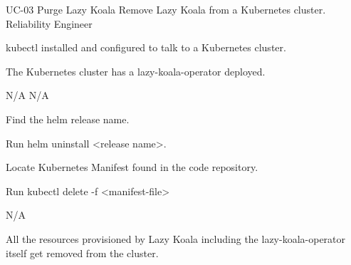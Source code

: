 \vspace{-2em}
\UseCaseDescription
{UC-03}
{Purge Lazy Koala}
{Remove Lazy Koala from a Kubernetes cluster.}
{Reliability Engineer}
{\begin{CompactItemizes}
    \item kubectl installed and configured to talk to a Kubernetes cluster.
    \item The Kubernetes cluster has a \ac{lazy-koala-operator} deployed.
\end{CompactItemizes}}
{N/A}
{N/A}
{\begin{CompactEnumerate}
    \item Find the helm release name.
    \item Run helm uninstall <release name>.
\end{CompactEnumerate}}
{{\begin{CompactEnumerate}
    \item Locate Kubernetes Manifest found in the code repository.
    \item Run kubectl delete -f <manifest-file>
\end{CompactEnumerate}}
{N/A}
{\begin{CompactItemizes}
    \item All the resources provisioned by Lazy Koala including the \ac{lazy-koala-operator} itself get removed from the cluster.
\end{CompactItemizes}}}

